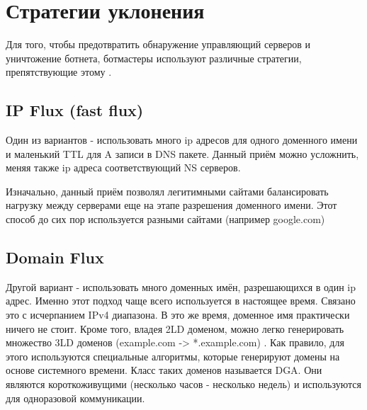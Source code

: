 \documentclass[14pt]{extreport}
\begin{document}
	
	\newpage
	\section{Стратегии уклонения}
	Для того, чтобы предотвратить обнаружение управляющий серверов и уничтожение ботнета, ботмастеры используют различные стратегии, препятствующие этому \cite{communication}.
	\subsection{IP Flux (fast flux)}
	Один из вариантов - использовать много ip адресов для одного доменного имени и маленький TTL для A записи в DNS пакете. Данный приём можно усложнить, меняя также ip адреса соответствующий NS серверов.
	
	Изначально, данный приём позволял легитимными сайтами балансировать нагрузку между серверами еще на этапе разрешения доменного имени. Этот способ до сих пор используется разными сайтами (например google.com)
	
	\subsection{Domain Flux}
	Другой вариант - использовать много доменных имён, разрешающихся в один ip адрес. Именно этот подход чаще всего используется в настоящее время. Связано это с исчерпанием IPv4 диапазона. В это же время, доменное имя практически ничего не стоит. Кроме того, владея 2LD доменом, можно легко генерировать множество 3LD доменов (example.com -> *.example.com) .
	Как правило, для этого используются специальные алгоритмы, которые генерируют домены на основе системного времени. Класс таких доменов называется DGA. Они являются короткоживущими (несколько часов - несколько недель) и используются для одноразовой коммуникации. 
	
\end{document}
